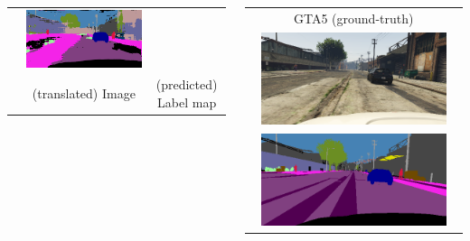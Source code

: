 \documentclass{beamer}
\begin{document}
\begin{frame}
\begin{columns}[c]
\begin{table}
{\begin{tabular}{cc||c}
\begin{minipage}[c]{\textwidth}
			\end{minipage} & 
			\begin{minipage}[c]{\textwidth}
				\includegraphics[width=\textwidth]{../images/evaluation/SG-GAN_pred_labels.png}
			\end{minipage} \\
			\multicolumn{1}{c}{} & \tiny (translated) Image & \tiny (predicted) Label map
		\end{tabular}}
	\end{table}
	\begin{table}
		\begin{tabular}{c}
			GTA5 (ground-truth) \\
			\includegraphics[width=0.9\textwidth]{../images/evaluation/GTA_gt_image.png}\\
			\includegraphics[width=0.9\textwidth]{../images/evaluation/GTA_gt_label.png}
		\end{tabular}
	\end{table}
\end{columns}
\end{frame}
\end{document}

